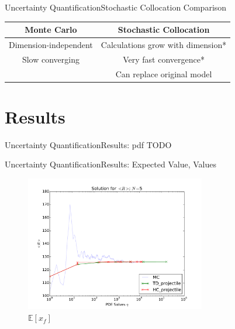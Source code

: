\documentclass{beamer}
\newcommand{\expv}[1]{\ensuremath{\mathbb{E}[ #1]}}
\begin{document}
\begin{frame}{Uncertainty Quantification}{Stochastic Collocation}\vspace{-20pt}
Comparison
\begin{table}
\centering
\begin{tabular}{c|c}\small
Monte Carlo & Stochastic Collocation \\\hline
Dimension-independent & Calculations grow with dimension* \\
Slow converging & Very fast convergence* \\
 & Can replace original model
\end{tabular}
\end{table}
\end{frame}

\section{Results}
\begin{frame}{Uncertainty Quantification}{Results: pdf}
TODO
\end{frame}

\begin{frame}{Uncertainty Quantification}{Results: Expected Value, Values}
  \begin{figure}[h!]
    \centering
      \includegraphics[width=0.7\textwidth]{../graphics/projectile_solns}
      \caption{$\expv{x_f}$}
  \end{figure}
\end{frame}
\end{document}
